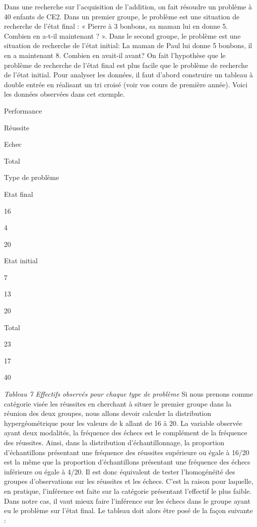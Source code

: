 \documentclass[]{book}
\theoremstyle{definition}
\theoremstyle{definition}
\theoremstyle{definition}
\theoremstyle{remark}
\begin{document}
Dans une recherche sur l'acquisition de l'addition, on fait résoudre un
problème à 40 enfants de CE2. Dans un premier groupe, le problème est
une situation de recherche de l'état final : « Pierre à 3 bonbons, sa
maman lui en donne 5. Combien en a-t-il maintenant ? ». Dans le second
groupe, le problème est une situation de recherche de l'état initial: La
maman de Paul lui donne 5 bonbons, il en a maintenant 8. Combien en
avait-il avant? On fait l'hypothèse que le problème de recherche de
l'état final est plus facile que le problème de recherche de l'état
initial. Pour analyser les données, il faut d'abord construire un
tableau à double entrée en réalisant un tri croisé (voir vos cours de
première année). Voici les données observées dans cet exemple.

Performance

Réussite

Echec

Total

Type de problème

Etat final

16

4

20

Etat initial

7

13

20

Total

23

17

40

\emph{Tableau 7 Effectifs observés pour chaque type de problème} Si nous
prenons comme catégorie visée les réussites en cherchant à situer le
premier groupe dans la réunion des deux groupes, nous allons devoir
calculer la distribution hypergéométrique pour les valeurs de k allant
de 16 à 20. La variable observée ayant deux modalités, la fréquence des
échecs est le complément de la fréquence des réussites. Ainsi, dans la
distribution d'échantillonnage, la proportion d'échantillons présentant
une fréquence des réussites supérieure ou égale à 16/20 est la même que
la proportion d'échantillons présentant une fréquence des échecs
inférieure ou égale à 4/20. Il est donc équivalent de tester
l'homogénéité des groupes d'observations sur les réussites et les
échecs. C'est la raison pour laquelle, en pratique, l'inférence est
faite sur la catégorie présentant l'effectif le plus faible. Dans notre
cas, il vaut mieux faire l'inférence sur les échecs dans le groupe ayant
eu le problème sur l'état final. Le tableau doit alors être posé de la
façon suivante :
\end{document}
